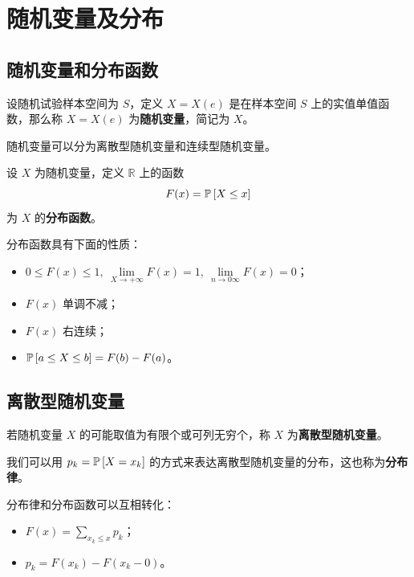 \section{随机变量及分布}

\subsection{随机变量和分布函数}

\begin{definition}[随机变量]
    设随机试验样本空间为 $S$，定义 $X = X(e)$ 是在样本空间 $S$ 上的实值单值函数，那么称 $X = X(e)$ 为\textbf{随机变量}，简记为 $X$。
\end{definition}

随机变量可以分为离散型随机变量和连续型随机变量。

\begin{definition}[分布函数]
    设 $X$ 为随机变量，定义 $\mathbb{R}$ 上的函数
    $$
    F(x) = \operatorname{\mathbb{P}}\left[X \le x\right]
    $$
    为 $X$ 的\textbf{分布函数}。
\end{definition}

分布函数具有下面的性质：

\begin{itemize}
    \item $0 \le F(x) \le 1,\ \lim\limits_{X \to +\infty} F(x) = 1,\ \lim\limits_{n \to 0\infty} F(x) = 0$；
    \item $F(x)$ 单调不减；
    \item $F(x)$ 右连续；
    \item $\operatorname{\mathbb{P}}\left[a \le X \le b\right] = F(b) - F(a)$。
\end{itemize}

\subsection{离散型随机变量}

\begin{definition}[离散型随机变量]
    若随机变量 $X$ 的可能取值为有限个或可列无穷个，称 $X$ 为\textbf{离散型随机变量}。
\end{definition}

我们可以用 $p_k = \operatorname{\mathbb{P}}\left[X = x_k\right]$ 的方式来表达离散型随机变量的分布，这也称为\textbf{分布律}。

分布律和分布函数可以互相转化：

\begin{itemize}
    \item $F(x) = \sum\limits_{x_k \le x} p_k$；
    \item $p_k = F(x_k) - F(x_k - 0)$。
\end{itemize}

